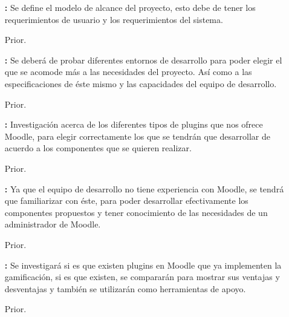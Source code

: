 \begin{itemize}
    	\item[\bf \ida] {\bf \desc:} Se define el modelo de alcance del proyecto, esto debe de tener los requerimientos de usuario y los requerimientos del sistema.
        \item[Prior.] \Valor
\end{itemize}

\begin{itemize}
    	\item[\bf \ida] {\bf \desc:} Se deberá de probar diferentes entornos de desarrollo para poder elegir el que se acomode más a las necesidades del proyecto. Así como a las especificaciones de éste mismo y las capacidades del equipo de desarrollo.
        \item[Prior.] \Valor
\end{itemize}

\begin{itemize}
    	\item[\bf \ida] {\bf \desc:} Investigación acerca de los diferentes tipos de plugins que nos ofrece Moodle, para elegir correctamente los que se tendrán que desarrollar de acuerdo a los componentes que se quieren realizar.
        \item[Prior.] \Valor
\end{itemize}

\begin{itemize}
    	\item[\bf \ida] {\bf \desc:} Ya que el equipo de desarrollo no tiene experiencia con Moodle, se tendrá que familiarizar con éste, para poder desarrollar efectivamente los componentes propuestos y tener conocimiento de las necesidades de un administrador de Moodle.
        \item[Prior.] \Valor
\end{itemize}

\begin{itemize}
    	\item[\bf \ida] {\bf \desc:} Se investigará si es que existen plugins en Moodle que ya implementen la gamificación, si es que existen, se compararán para mostrar sus ventajas y desventajas y también se utilizarán como herramientas de apoyo.
        \item[Prior.] \Valor
\end{itemize}

